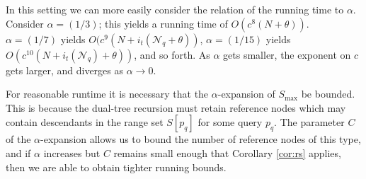 


In this setting we can more easily consider the relation of the running time to
$\alpha$.  Consider $\alpha = (1 / 3)$; this yields a running time of $O(c^8 (N
+ \theta))$.  $\alpha = (1 / 7)$ yields $O(c^9 (N + i_t(\mathscr{N}_q +
\theta))$, $\alpha = (1 / 15)$ yields $O(c^{10} (N + i_t(\mathscr{N}_q) +
\theta))$, and so forth.  As $\alpha$ gets smaller, the exponent on $c$ gets
larger, and diverges as $\alpha \to 0$.

For reasonable runtime it is necessary that the $\alpha$-expansion of $S_{\max}$
be bounded.  This is because the dual-tree recursion must retain reference nodes
which may contain descendants in the range set $S[p_q]$ for some query $p_q$.
The parameter $C$ of the $\alpha$-expansion allows us to bound the number of
reference nodes of this type, and if $\alpha$ increases but $C$ remains small
enough that Corollary \ref{cor:rs} applies, then we are able to obtain tighter
running bounds.



